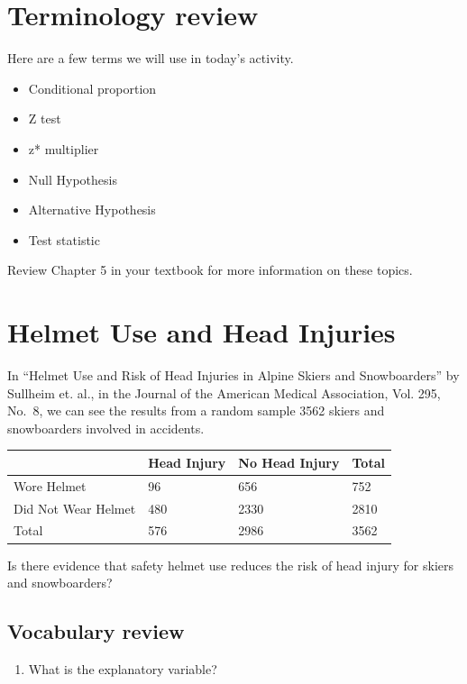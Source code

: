 \documentclass[
]{report}
\providecommand{\tightlist}{%
  \setlength{\itemsep}{0pt}\setlength{\parskip}{0pt}}
\begin{document}
\hypertarget{terminology-review}{%
\section{Terminology review}\label{terminology-review}}

Here are a few terms we will use in today's activity.

\begin{itemize}
\item
  Conditional proportion
\item
  Z test
\item
  z* multiplier
\item
  Null Hypothesis
\item
  Alternative Hypothesis
\item
  Test statistic
\end{itemize}

Review Chapter 5 in your textbook for more information on these topics.

\hypertarget{helmet-use-and-head-injuries-1}{%
\section{Helmet Use and Head Injuries}\label{helmet-use-and-head-injuries-1}}

In ``Helmet Use and Risk of Head Injuries in Alpine Skiers and Snowboarders'' by Sullheim et. al., in the Journal of the American Medical Association, Vol. 295, No.~8, we can see the results from a random sample 3562 skiers and snowboarders involved in accidents.

\begin{longtable}[]{@{}llll@{}}
\toprule
& Head Injury & No Head Injury & Total\tabularnewline
\midrule
\endhead
Wore Helmet & 96 & 656 & 752\tabularnewline
Did Not Wear Helmet & 480 & 2330 & 2810\tabularnewline
Total & 576 & 2986 & 3562\tabularnewline
\bottomrule
\end{longtable}

Is there evidence that safety helmet use reduces the risk of head injury for skiers and snowboarders?

\hypertarget{vocabulary-review}{%
\subsection{Vocabulary review}\label{vocabulary-review}}

\begin{enumerate}
\def\labelenumi{\arabic{enumi}.}
\tightlist
\item
  What is the explanatory variable?
\end{enumerate}
\end{document}
